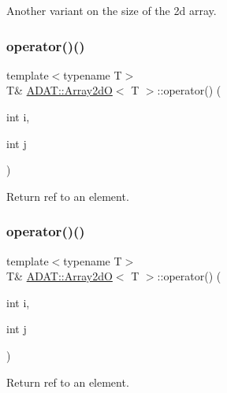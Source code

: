 Another variant on the size of the 2d array. 

\mbox{\label{classADAT_1_1Array2dO_ace450ca2a5484194b075e240750cfeae}} 
\subsubsection{\texorpdfstring{operator()()}{operator()()}\hspace{0.1cm}{\footnotesize\ttfamily [1/6]}}
{\footnotesize\ttfamily template$<$typename T$>$ \\
T\& \mbox{\hyperlink{classADAT_1_1Array2dO}{A\+D\+A\+T\+::\+Array2dO}}$<$ T $>$\+::operator() (\begin{DoxyParamCaption}\item[{int}]{i,  }\item[{int}]{j }\end{DoxyParamCaption})\hspace{0.3cm}{\ttfamily [inline]}}



Return ref to an element. 

\mbox{\label{classADAT_1_1Array2dO_ace450ca2a5484194b075e240750cfeae}} 
\subsubsection{\texorpdfstring{operator()()}{operator()()}\hspace{0.1cm}{\footnotesize\ttfamily [2/6]}}
{\footnotesize\ttfamily template$<$typename T$>$ \\
T\& \mbox{\hyperlink{classADAT_1_1Array2dO}{A\+D\+A\+T\+::\+Array2dO}}$<$ T $>$\+::operator() (\begin{DoxyParamCaption}\item[{int}]{i,  }\item[{int}]{j }\end{DoxyParamCaption})\hspace{0.3cm}{\ttfamily [inline]}}



Return ref to an element. 

